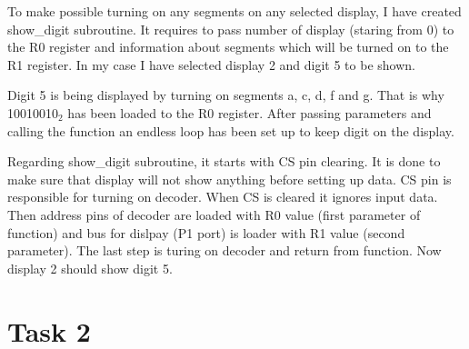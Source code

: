 \documentclass{article}
\begin{document}
To make possible turning on any segments on any selected display, I have created show\_digit
subroutine. It requires to pass number of display (staring from 0) to the R0 register
and information about segments which will be turned on to the R1 register. In my case
I have selected display 2 and digit 5 to be shown.

Digit 5 is being displayed by turning on segments a, c, d, f and g. That is why
10010010$_2$ has been loaded to the R0 register. After passing parameters and calling the function
an endless loop has been set up to keep digit on the display.

Regarding show\_digit subroutine, it starts with CS pin clearing. It is done to make sure
that display will not show anything before setting up data. CS pin is responsible for
turning on decoder. When CS is cleared it ignores input data. Then address pins
of decoder are loaded with R0 value (first parameter of function) and bus for dislpay
(P1 port) is loader with R1 value (second parameter). The last step is turing on decoder
and return from function. Now display 2 should show digit 5.

\section{Task 2}
\end{document}
